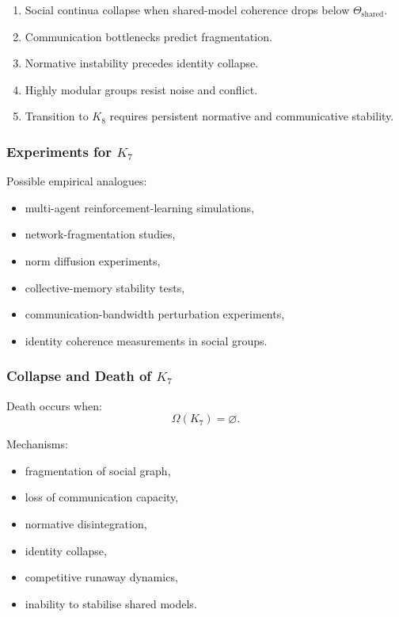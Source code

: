 \begin{enumerate}
    \item Social continua collapse when shared-model coherence drops below $\Theta_{\mathrm{shared}}$.
    \item Communication bottlenecks predict fragmentation.
    \item Normative instability precedes identity collapse.
    \item Highly modular groups resist noise and conflict.
    \item Transition to $K_8$ requires persistent normative and communicative stability.
\end{enumerate}

\subsubsection{Experiments for \texorpdfstring{$K_7$}{K_7}}

Possible empirical analogues:
\begin{itemize}
    \item multi-agent reinforcement-learning simulations,
    \item network-fragmentation studies,
    \item norm diffusion experiments,
    \item collective-memory stability tests,
    \item communication-bandwidth perturbation experiments,
    \item identity coherence measurements in social groups.
\end{itemize}

\subsubsection{Collapse and Death of \texorpdfstring{$K_7$}{K_7}}

Death occurs when:
\[
\Omega(K_7) = \varnothing.
\]

Mechanisms:
\begin{itemize}
    \item fragmentation of social graph,
    \item loss of communication capacity,
    \item normative disintegration,
    \item identity collapse,
    \item competitive runaway dynamics,
    \item inability to stabilise shared models.
\end{itemize}

